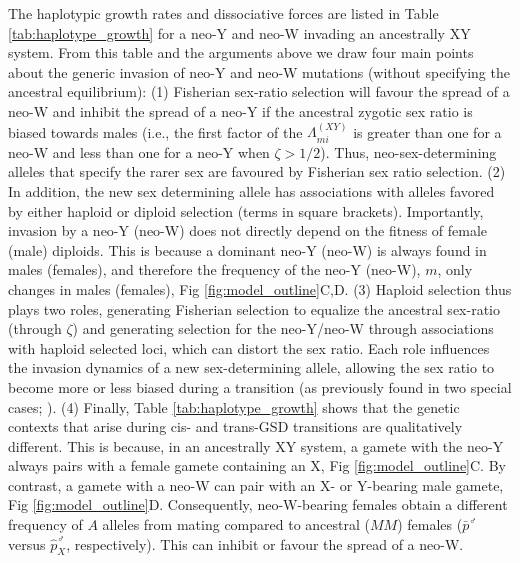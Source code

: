 \documentclass[10pt,letterpaper]{article}
\begin{document}
The haplotypic growth rates and dissociative forces are listed in Table \ref{tab:haplotype_growth} for a neo-Y and neo-W invading an ancestrally XY system.
From this table and the arguments above we draw four main points about the generic invasion of neo-Y and neo-W mutations (without specifying the ancestral equilibrium):
(1) Fisherian sex-ratio selection will favour the spread of a neo-W and inhibit the spread of a neo-Y if the ancestral zygotic sex ratio is biased towards males (i.e., the first factor of the $\Lambda_{mi}^{(XY)}$ is greater than one for a neo-W and less than one for a neo-Y when $\zeta>1/2$).
Thus, neo-sex-determining alleles that specify the rarer sex are favoured by Fisherian sex ratio selection. 
(2) In addition, the new sex determining allele has associations with alleles favored by either haploid or diploid selection (terms in square brackets).    
Importantly, invasion by a neo-Y (neo-W) does not directly depend on the fitness of female (male) diploids. 
This is because a dominant neo-Y (neo-W) is always found in males (females), and therefore the frequency of the neo-Y (neo-W), $m$, only changes in males (females), Fig \ref{fig:model_outline}C,D.
(3) Haploid selection thus plays two roles, generating Fisherian selection to equalize the ancestral sex-ratio (through $\zeta$) and generating selection for the neo-Y/neo-W through associations with haploid selected loci, which can distort the sex ratio. 
Each role influences the invasion dynamics of a new sex-determining allele, allowing the sex ratio to become more or less biased during a transition (as previously found in two special cases; \cite{Kozielska:2010vm,Ubeda:2015fx}). 
(4) Finally, Table \ref{tab:haplotype_growth} shows that the genetic contexts that arise during cis- and trans-GSD transitions are qualitatively different.
This is because, in an ancestrally XY system, a gamete with the neo-Y always pairs with a female gamete containing an X, Fig \ref{fig:model_outline}C.
By contrast, a gamete with a neo-W can pair with an X- or Y-bearing male gamete, Fig \ref{fig:model_outline}D.
Consequently, neo-W-bearing females obtain a different frequency of $A$ alleles from mating compared to ancestral ($MM$) females ($\bar{p}^\male$ versus $\hat{p}_X^\male$, respectively). 
This can inhibit or favour the spread of a neo-W.
\end{document}
